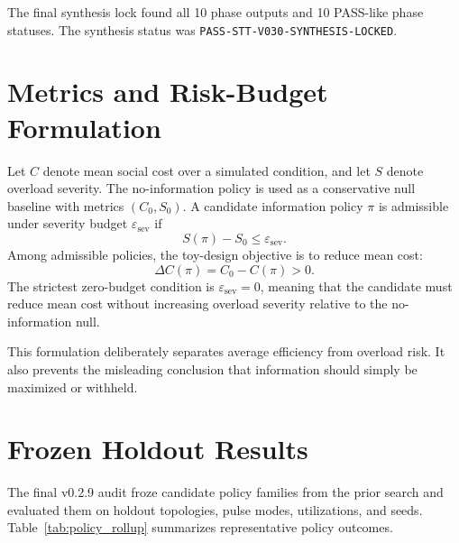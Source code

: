 \documentclass[11pt]{article}
\newcommand{\code}[1]{\texttt{#1}}
\newcommand{\riskbudget}{\varepsilon_{\mathrm{sev}}}
\begin{document}
The final synthesis lock found all 10 phase outputs and 10 PASS-like phase statuses. The synthesis status was \code{PASS-STT-V030-SYNTHESIS-LOCKED}.

\section{Metrics and Risk-Budget Formulation}
Let $C$ denote mean social cost over a simulated condition, and let $S$ denote overload severity. The no-information policy is used as a conservative null baseline with metrics $(C_0,S_0)$. A candidate information policy $\pi$ is admissible under severity budget $\riskbudget$ if
\begin{equation}
S(\pi) - S_0 \leq \riskbudget.
\end{equation}
Among admissible policies, the toy-design objective is to reduce mean cost:
\begin{equation}
\Delta C(\pi) = C_0 - C(\pi) > 0.
\end{equation}
The strictest zero-budget condition is $\riskbudget=0$, meaning that the candidate must reduce mean cost without increasing overload severity relative to the no-information null.

This formulation deliberately separates average efficiency from overload risk. It also prevents the misleading conclusion that information should simply be maximized or withheld.

\section{Frozen Holdout Results}
The final v0.2.9 audit froze candidate policy families from the prior search and evaluated them on holdout topologies, pulse modes, utilizations, and seeds. Table~\ref{tab:policy_rollup} summarizes representative policy outcomes.

\begin{table}[H]
\centering
\small
\caption{Representative v0.2.9 frozen-holdout policy results. Positive improvement means lower mean cost than the no-information baseline.}
\label{tab:policy_rollup}
\end{table}
\end{document}
